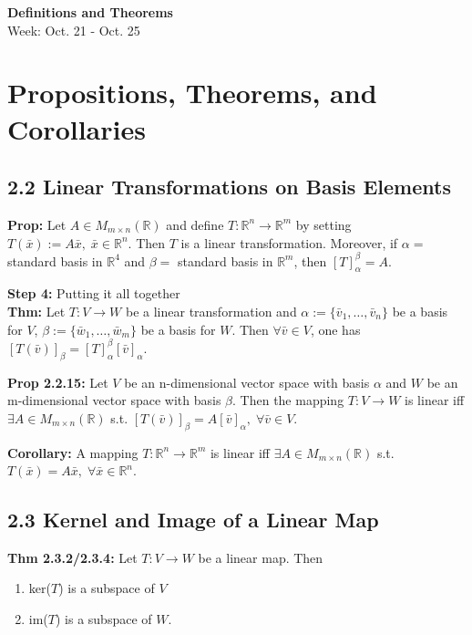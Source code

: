 \noindent
\textbf{\LARGE Definitions and Theorems} \\
\large Week: Oct. 21 - Oct. 25

\normalsize

\section*{Propositions, Theorems, and Corollaries}

\subsection*{2.2 Linear Transformations on Basis Elements}

\textbf{Prop:} Let $A \in M_{m \times n}(\mathbb{R})$ and define $T: \mathbb{R}^n \rightarrow \mathbb R^m$ by setting $T(\bar x) := A\bar x, \; \bar x \in \mathbb{R}^n$. Then $T$ is a linear transformation. Moreover, if $\alpha = $ standard basis in $\mathbb{R}^4$ and $\beta = $ standard basis in $\mathbb{R}^m$, then $[T]_\alpha ^ \beta = A$.

\bigskip 

\noindent 
\textbf{Step 4:} Putting it all together \\
\textbf{Thm:} Let $T: V \rightarrow W$ be a linear transformation and $\alpha := \{\bar v_1, \ldots , \bar v_n \}$ be a basis for $V$, $\beta := \{\bar w_1, \ldots , \bar w_m \}$ be a basis for $W$. Then $\forall \bar v \in V$, one has $[T(\bar v)]_\beta = [T]_\alpha ^\beta [\bar v]_\alpha$.

\bigskip 

\noindent 
\textbf{Prop 2.2.15:} Let $V$ be an n-dimensional vector space with basis $\alpha$ and $W$ be an m-dimensional vector space with basis $\beta$. Then the mapping $T: V \rightarrow W$ is linear iff $\exists A \in M_{m \times n}(\mathbb{R})$ s.t. $[T(\bar v)]_\beta = A[\bar v]_\alpha, \; \forall \bar v \in V$.

\bigskip 

\noindent 
\textbf{Corollary:} A mapping $T: \mathbb{R}^n \rightarrow \mathbb{R}^m$ is linear iff $\exists A \in M_{m \times n}(\mathbb{R})$ s.t. $T(\bar x) = A\bar x, \; \forall \bar x \in \mathbb{R}^n$.

\subsection*{2.3 Kernel and Image of a Linear Map}

\textbf{Thm 2.3.2/2.3.4:} Let $T : V \rightarrow W$ be a linear map. Then 
\begin{enumerate}
    \item ker($T$) is a subspace of $V$
    \item im($T$) is a subspace of $W$.
\end{enumerate}

